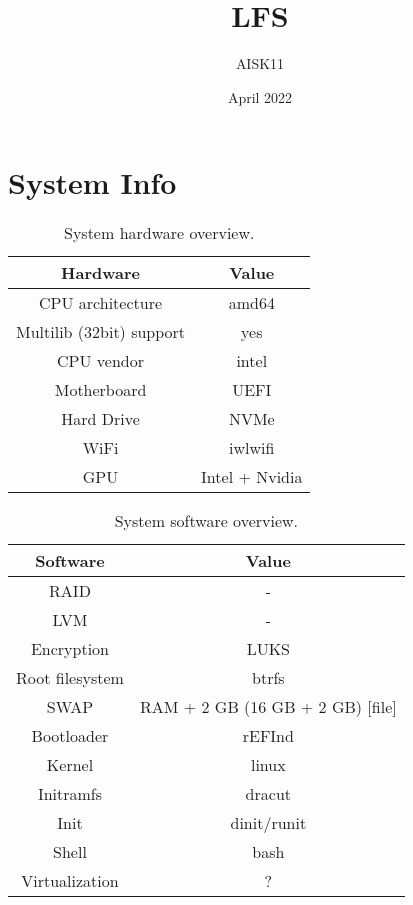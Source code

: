 \documentclass[10pt, a4paper, onecolumn, oneside, titlepage, openany]{book}
\title{\textbf{LFS}}
\author{AISK11}
\date{April 2022}
\begin{document}
\maketitle
\tableofcontents

\chapter{System Info}
\begin{table}[!ht]
\centering
\begin{tabular}{|c|c|}
    \hline
    \textbf{Hardware} & \textbf{Value} \\
    \hline
    CPU architecture & amd64\\
    Multilib (32bit) support& yes\\
    CPU vendor & intel\\
    Motherboard & UEFI\\
    Hard Drive & NVMe\\
    WiFi & iwlwifi\\
    GPU & Intel + Nvidia\\
    \hline
\end{tabular}
\caption{System hardware overview.}
\label{table:1}
\end{table}

\begin{table}[!ht]
\centering
\begin{tabular}{|c|c|}
    \hline
    \textbf{Software} & \textbf{Value} \\
    \hline
    RAID & -\\
    LVM & -\\
    Encryption & LUKS\\
    Root filesystem & btrfs\\
    SWAP & RAM + 2 GB (16 GB + 2 GB) [file]\\
    Bootloader & rEFInd\\
    Kernel & linux\\
    Initramfs & dracut\\
    Init & dinit/runit\\
    Shell & bash\\
    Virtualization & ?\\
    \hline
\end{tabular}
\caption{System software overview.}
\label{table:2}
\end{table}
\end{document}
